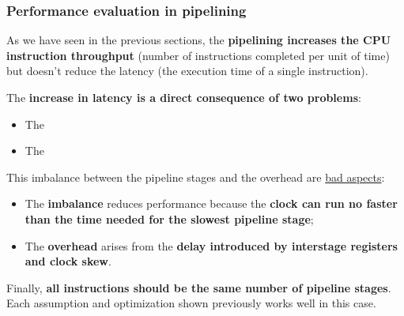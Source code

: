 \subsubsection{Performance evaluation in pipelining}

As we have seen in the previous sections, the \textbf{pipelining increases the CPU instruction throughput} (number of instructions completed per unit of time) but doesn't reduce the latency (the execution time of a single instruction).

\highspace
The \textbf{increase in latency is a direct consequence of two problems}:
\begin{itemize}
    \item The 

    \item The 
\end{itemize}
This imbalance between the pipeline stages and the overhead are \underline{bad aspects}:
\begin{itemize}
    \item The \textbf{imbalance} reduces performance because the \textbf{clock can run no faster than the time needed for the slowest pipeline stage};

    \item The \textbf{overhead} arises from the \textbf{delay introduced by interstage registers and clock skew}.
\end{itemize}
Finally, \textbf{all instructions should be the same number of pipeline stages}. Each assumption and optimization shown previously works well in this case.

